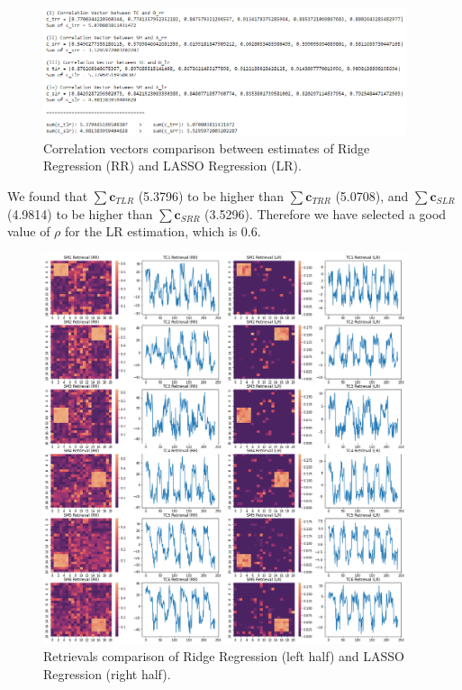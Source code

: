 \documentclass[11pt]{article}
\begin{document}
    \begin{figure}[H]
        \begin{center}
            \includegraphics[width=0.95\textwidth]{../plots/2_4_CorrVector_RRvsLR}
        \caption{Correlation vectors comparison between estimates of Ridge Regression (RR) and LASSO Regression (LR).}
        \label{fig:corrvec_lr_rr}
        \end{center}
    \end{figure}

We found that $\sum \mathbf{c}_{TLR}$ (5.3796) to be higher than $\sum \mathbf{c}_{TRR}$ (5.0708), and $\sum \mathbf{c}_{SLR}$ (4.9814) to be higher than $\sum \mathbf{c}_{SRR}$ (3.5296). Therefore we have selected a good value of $\rho$ for the LR estimation, which is 0.6. 

    \begin{figure}[H]
        \begin{center}
            \includegraphics[width=0.95\textwidth]{../plots/2_4_RR_vs_LR_all}
        \caption{Retrievals comparison of Ridge Regression (left half) and LASSO Regression (right half).}
        \label{fig:rr_vs_lr_all}
        \end{center}
    \end{figure}
\end{document}
